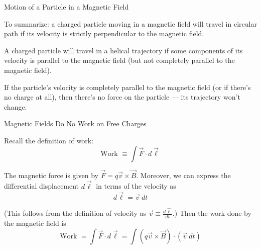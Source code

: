 \documentclass{beamer}
\begin{document}
\begin{frame}{Motion of a Particle in a Magnetic Field}

To summarize: a charged particle moving in a magnetic field will travel in circular path if its velocity is strictly perpendicular to the magnetic field.

\vfill

A charged particle will travel in a helical trajectory if some components of its velocity is parallel to the magnetic field (but not completely parallel to the magnetic field).

\vfill

If the particle's velocity is completely parallel to the magnetic field (or if there's no charge at all), then there's no force on the particle --- its trajectory won't change.

\end{frame}

\begin{frame}{Magnetic Fields Do No Work on Free Charges}

Recall the definition of work:
\begin{equation*}
    \text{Work } \equiv \int \vec{F} \cdot d\vec{\ell}
\end{equation*}

The magnetic force is given by $\vec{F} = q\vec{v} \times \vec{B}$. Moreover, we can express the differential displacement $d\vec{\ell}$ in terms of the velocity as
\begin{equation*}
    d\vec{\ell} = \vec{v}\ dt
\end{equation*}

(This follows from the definition of velocity as $\vec{v} \equiv \frac{d\vec{\ell}}{dt}$.) Then the work done by the magnetic field is
\begin{equation*}
    \text{Work } = \int \vec{F} \cdot d\vec{\ell} = \int \left( q\vec{v} \times \vec{B} \right) \cdot \left( \vec{v}\ dt \right)
\end{equation*}

\end{frame}
\end{document}
